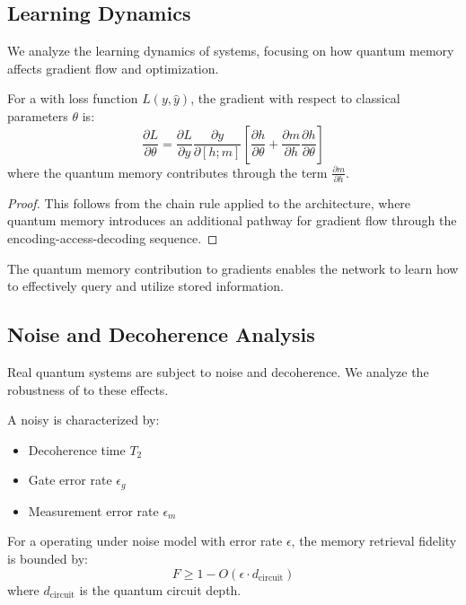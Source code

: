\subsection{Learning Dynamics}

We analyze the learning dynamics of \qmann systems, focusing on how quantum memory affects gradient flow and optimization.

\begin{theorem}
\label{thm:gradient_flow}
For a \qmann with loss function $L(y, \hat{y})$, the gradient with respect to classical parameters $\theta$ is:
$$\frac{\partial L}{\partial \theta} = \frac{\partial L}{\partial y} \frac{\partial y}{\partial [h; m]} \left[ \frac{\partial h}{\partial \theta} + \frac{\partial m}{\partial h} \frac{\partial h}{\partial \theta} \right]$$
where the quantum memory contributes through the term $\frac{\partial m}{\partial h}$.
\end{theorem}

\begin{proof}
This follows from the chain rule applied to the \qmann architecture, where quantum memory introduces an additional pathway for gradient flow through the encoding-access-decoding sequence.
\end{proof}

The quantum memory contribution to gradients enables the network to learn how to effectively query and utilize stored information.

\subsection{Noise and Decoherence Analysis}

Real quantum systems are subject to noise and decoherence. We analyze the robustness of \qmann to these effects.

\begin{definition}
\label{def:noisy_qram}
A noisy \qram is characterized by:
\begin{itemize}
    \item Decoherence time $T_2$
    \item Gate error rate $\epsilon_g$
    \item Measurement error rate $\epsilon_m$
\end{itemize}
\end{definition}

\begin{theorem}
\label{thm:noise_resilience}
For a \qmann operating under noise model with error rate $\epsilon$, the memory retrieval fidelity is bounded by:
$$F \geq 1 - O(\epsilon \cdot d_{\text{circuit}})$$
where $d_{\text{circuit}}$ is the quantum circuit depth.
\end{theorem}


